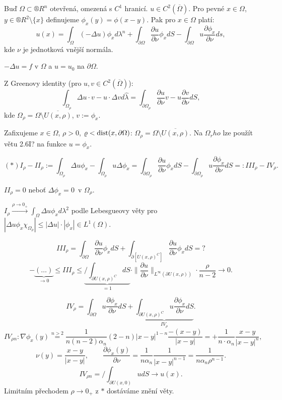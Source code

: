 \documentclass[12pt]{article}					%
\begin{document}
\begin{veta}[O 3 potenciálech]
	Buď $\Omega \subset ®R^n$ otevřená, omezená s $C^1$ hranicí. $u \in C^2(\overline{\Omega})$. Pro pevné $x \in \Omega$, $y \in ®R^2 \setminus\{x\}$ definujeme $\phi_x(y) = \phi(x - y)$. Pak pro $x \in \Omega$ platí:
	$$ u(x) = \int_\Omega (-\Delta u) \phi_x d\lambda^n + \int_{\partial \Omega} \frac{\partial u}{\partial \nu}\phi_x dS - \int_{\partial \Omega} u \frac{\partial \phi_x}{\partial \nu} ds, $$
	kde $\nu$ je jednotková vnější normála.

	\begin{poznamkain}
		$-\Delta u = f$ v $\Omega$ a $u = u_0$ na $\partial \Omega$.
	\end{poznamkain}

	\begin{dukazin}
		Z Greenovy identity (pro $u, v \in C^2(\overline{\Omega})$):
		$$ \int_{\Omega_\rho} \Delta u · v - u · \Delta v d\hat{\lambda} = \int_{\partial \Omega_\rho} \frac{\partial u}{\partial \nu} v - u \frac{\partial v}{\partial \nu} dS, $$
		kde $\Omega_\rho = \Omega \setminus \overline{U(x, \rho)}$, $v:= \phi_x$.

		Zafixujeme $x \in \Omega$, $\rho > 0$, $\varrho < \operatorname{dist}(x, \partial \Omega)$: $\Omega_\rho = \Omega \setminus \overline{U(x, \rho)}$. Na $\Omega_rho$ lze použít větu 2.6I? na funkce $u = \phi_x$.

		$$ (*) I_\rho - II_\rho := \int_{\Omega_\rho} \Delta u \phi_x - \int_{\Omega_\rho} u \Delta \phi_x = \int_{\partial \Omega_\rho} \frac{\partial u}{\partial \nu} \phi_x dS - \int_{\partial \Omega_\rho} u \frac{\partial \phi_x}{\partial \nu} dS =: III_\rho - IV_\rho. $$

		$II_\rho = 0$ neboť $\Delta \phi_x = 0$ v $\Omega_\rho$.

		$I_\rho \overset{\rho \rightarrow 0_+}\longrightarrow \int_\Omega \Delta u \phi_x d\lambda^2$ podle Lebesgueovy věty pro $|\Delta u \phi_x \chi_{\Omega_\rho}| ≤ |\Delta u|·|\phi_x| \in L^1(\Omega)$.

		$$ III_\rho = \int_{\partial \Omega} \frac{\partial u}{\partial \nu} \phi_x dS + \int_{\partial[U(x, \rho)^C]} \frac{\partial u}{\partial \nu} \phi_x dS = ? $$
		$$ -\underbrace{(…)}_{\rightarrow 0} ≤ III_\rho ≤ \underbrace{/\!\!\!\!\!\int_{\partial U(x, \rho)^C} dS}_{=1} · \|\frac{\partial u}{\partial \nu}\|_{L^∞(\partial U(x, \rho))}·\frac{\rho}{n-2} \rightarrow 0. $$

		$$ IV_\rho = \int_{\partial \Omega} u \frac{\partial \phi_x}{\partial \nu} dS + \underbrace{\int_{\partial U(x, \rho)^C} u \frac{\partial \phi_x}{\partial \nu} dS}_{IV_\rho}. $$
		$$ IV_{\rho n}: \nabla \phi_x(y) \overset{n > 2} = \frac{1}{n(n-2)\alpha_n} (2 - n) |x - y|^{1 - n} \frac{-(x - y)}{|x - y|} = + \frac{1}{n·\alpha_n} \frac{x - y}{|x - y|^n}, $$
		$$ \nu(y) = \frac{x - y}{|x - y|}, \qquad \frac{\partial \phi_x(y)}{\partial \nu} = \frac{1}{n \alpha_n} \frac{1}{|x - y|^{n-1}} = \frac{1}{n \alpha_n \rho^{n-1}}. $$
		$$ IV_{\rho n} = /\!\!\!\!\!\int_{\partial U(x, 0)} u dS \rightarrow u(x). $$
		Limitním přechodem $\rho \rightarrow 0_+$ z $*$ dostáváme znění věty.
	\end{dukazin}

\end{veta}
\end{document}

